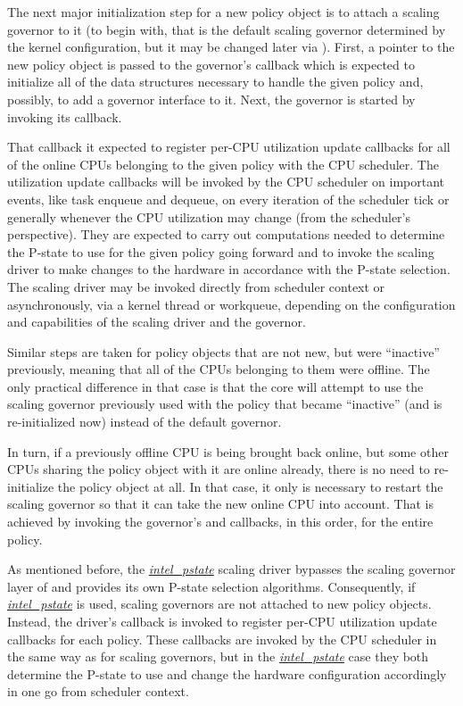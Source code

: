 \documentclass[a4paper,8pt,english]{sphinxmanual}
\begin{document}
The next major initialization step for a new policy object is to attach a
scaling governor to it (to begin with, that is the default scaling governor
determined by the kernel configuration, but it may be changed later
via ).  First, a pointer to the new policy object is passed to the
governor's  callback which is expected to initialize all of the
data structures necessary to handle the given policy and, possibly, to add
a governor  interface to it.  Next, the governor is started by
invoking its  callback.

That callback it expected to register per-CPU utilization update callbacks for
all of the online CPUs belonging to the given policy with the CPU scheduler.
The utilization update callbacks will be invoked by the CPU scheduler on
important events, like task enqueue and dequeue, on every iteration of the
scheduler tick or generally whenever the CPU utilization may change (from the
scheduler's perspective).  They are expected to carry out computations needed
to determine the P-state to use for the given policy going forward and to
invoke the scaling driver to make changes to the hardware in accordance with
the P-state selection.  The scaling driver may be invoked directly from
scheduler context or asynchronously, via a kernel thread or workqueue, depending
on the configuration and capabilities of the scaling driver and the governor.

Similar steps are taken for policy objects that are not new, but were ``inactive''
previously, meaning that all of the CPUs belonging to them were offline.  The
only practical difference in that case is that the  core will attempt
to use the scaling governor previously used with the policy that became
``inactive'' (and is re-initialized now) instead of the default governor.

In turn, if a previously offline CPU is being brought back online, but some
other CPUs sharing the policy object with it are online already, there is no
need to re-initialize the policy object at all.  In that case, it only is
necessary to restart the scaling governor so that it can take the new online CPU
into account.  That is achieved by invoking the governor's  and
 callbacks, in this order, for the entire policy.

As mentioned before, the {\hyperref[admin\string-guide/pm/intel_pstate::doc]{\emph{\emph{intel\_pstate}}}} scaling driver bypasses the scaling
governor layer of  and provides its own P-state selection algorithms.
Consequently, if {\hyperref[admin\string-guide/pm/intel_pstate::doc]{\emph{\emph{intel\_pstate}}}} is used, scaling governors are not attached to
new policy objects.  Instead, the driver's  callback is invoked
to register per-CPU utilization update callbacks for each policy.  These
callbacks are invoked by the CPU scheduler in the same way as for scaling
governors, but in the {\hyperref[admin\string-guide/pm/intel_pstate::doc]{\emph{\emph{intel\_pstate}}}} case they both determine the P-state to
use and change the hardware configuration accordingly in one go from scheduler
context.
\end{document}
